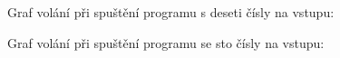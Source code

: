 \documentclass[12pt]{article}
\begin{document}
\noindent Graf volání při spuštění programu s deseti čísly na vstupu:

\begin{figure}[ht]
    \centering
\end{figure}
\begin{figure}[ht]
    \centering
\end{figure}
\newpage
\noindent Graf volání při spuštění programu se sto čísly na vstupu:
\end{document}
